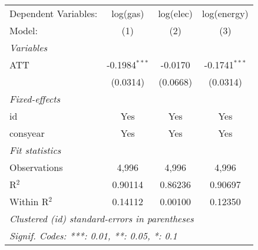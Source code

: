 
\begin{tabular}{lccc}
   \tabularnewline\midrule\midrule
   Dependent Variables: & log(gas)        & log(elec) & log(energy)\\
   Model:               & (1)             & (2)       & (3)\\
   \midrule \emph{Variables} &   &   &  \\
   ATT                  & -0.1984$^{***}$ & -0.0170   & -0.1741$^{***}$\\
                        & (0.0314)        & (0.0668)  & (0.0314)\\
   \midrule \emph{Fixed-effects} &   &   &  \\
   id                   & Yes             & Yes       & Yes\\
   consyear             & Yes             & Yes       & Yes\\
   \midrule \emph{Fit statistics} &   &   &  \\
   Observations         & 4,996           & 4,996     & 4,996\\
   R$^2$                & 0.90114         & 0.86236   & 0.90697\\
   Within R$^2$         & 0.14112         & 0.00100   & 0.12350\\
   \midrule\midrule\multicolumn{4}{l}{\emph{Clustered (id) standard-errors in parentheses}}\\
   \multicolumn{4}{l}{\emph{Signif. Codes: ***: 0.01, **: 0.05, *: 0.1}}\\
\end{tabular}


